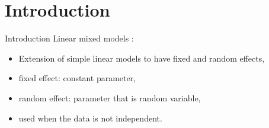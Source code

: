 \documentclass[unknownkeysallowed]{beamer}
\begin{document}

\section{Introduction}
\label{sec:introdcution}

\begin{frame}{Introduction}
Linear mixed models :
\begin{itemize}
    \item Extension of simple linear models to have fixed and random effects,
    \item fixed effect: constant parameter,
    \item random effect: parameter that is random variable,
    \item used when the data is not independent.
    \end{itemize}
\end{frame}
\end{document}
